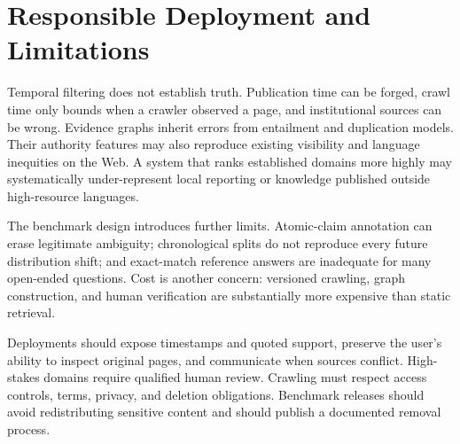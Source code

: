 \section{Responsible Deployment and Limitations}
\label{sec:limitations}

Temporal filtering does not establish truth.  Publication time can be forged,
crawl time only bounds when a crawler observed a page, and institutional sources
can be wrong.  Evidence graphs inherit errors from entailment and duplication
models.  Their authority features may also reproduce existing visibility and
language inequities on the Web.  A system that ranks established domains more
highly may systematically under-represent local reporting or knowledge published
outside high-resource languages.

The benchmark design introduces further limits.  Atomic-claim annotation can
erase legitimate ambiguity; chronological splits do not reproduce every future
distribution shift; and exact-match reference answers are inadequate for many
open-ended questions.  Cost is another concern: versioned crawling, graph
construction, and human verification are substantially more expensive than
static retrieval.

Deployments should expose timestamps and quoted support, preserve the user's
ability to inspect original pages, and communicate when sources conflict.
High-stakes domains require qualified human review.  Crawling must respect access
controls, terms, privacy, and deletion obligations.  Benchmark releases should
avoid redistributing sensitive content and should publish a documented removal
process.
